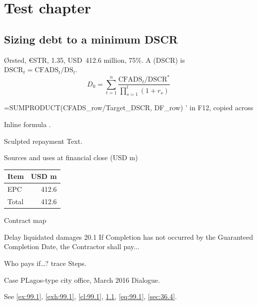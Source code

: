 \chapter{Test chapter}\label{ch:99}
\section{Sizing debt to a minimum DSCR}\label{sec:99.1}
Ørsted, €STR, 1.35\x, USD~412.6 million, 75\%. A  (DSCR) is
$\mathrm{DSCR}_t = \mathrm{CFADS}_t / \mathrm{DS}_t$.
\begin{equation}\label{eq:99.1}
D_0=\sum_{t=1}^{n}\frac{\mathrm{CFADS}_t/\mathrm{DSCR}^{*}}{\prod_{s=1}^{t}(1+r_s)}
\end{equation}
\begin{excel}
=SUMPRODUCT(CFADS_row/Target_DSCR, DF_row)   ' in F12, copied across
\end{excel}
Inline formula .
\begin{example}{Sculpted repayment \illustrative}\label{ex:99.1}
Text.
\end{example}
\begin{exhibit}[H]\caption{Sources and uses at financial close (USD m)}\label{exh:99.1}
\begin{tabularx}{\linewidth}{L r}\toprule Item & USD m\\\midrule EPC & 412.6\\ Total & 412.6\\\bottomrule\end{tabularx}
\end{exhibit}
\begin{exhibit}[H]\caption{Contract map}\label{exh:99.2}\centering
{}\end{exhibit}
\begin{clause}{Delay liquidated damages}\label{cl:99.1}
20.1 If Completion has not occurred by the Guaranteed Completion Date, the Contractor shall pay...
\end{clause}
\begin{framework}{Who pays if\ldots? trace} Steps. \end{framework}
\begin{casescene}{Case P}{Lagos-type city office, March 2016} Dialogue. \end{casescene}
See \cref{ex:99.1}, \cref{exh:99.1}, \cref{cl:99.1}, \cref{sec:99.1}, \cref{eq:99.1}, \cref{sec:36.4}.
